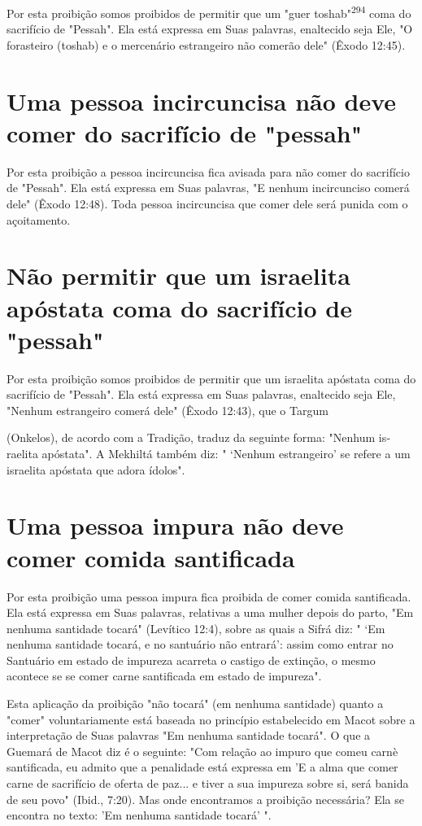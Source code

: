 \begin{itemize}
\begin{enumrate}
\begin{itemize}
\begin{itemize}
\begin{itemize}
Por esta proibição somos proibidos de permitir que um "guer
tos­hab"\textsuperscript{294} coma do sacrifício de "Pessah". Ela está
expressa em Suas palavras, enaltecido seja Ele, "O forasteiro (toshab) e
o mercenário estrangeiro não co­merão dele" (Êxodo 12:45).

\section{Uma pessoa incircuncisa não deve comer do sacrifício de "pessah"}

Por esta proibição a pessoa incircuncisa fica avisada para não comer do
sacrifício de "Pessah". Ela está expressa em Suas palavras, "E nenhum
incir­cunciso comerá dele" (Êxodo 12:48). Toda pessoa incircuncisa que
comer de­le será punida com o açoitamento.

\section{Não permitir que um israelita apóstata coma do sacrifício de "pessah"}

Por esta proibição somos proibidos de permitir que um israelita
após­tata coma do sacrifício de "Pessah". Ela está expressa em Suas
palavras, enalte­cido seja Ele, "Nenhum estrangeiro comerá dele" (Êxodo
12:43), que o Targum

(Onkelos), de acordo com a Tradição, traduz da seguinte forma: "Nenhum
is­raelita apóstata". A Mekhiltá também diz: " `Nenhum estrangeiro' se
refere a um israelita apóstata que adora ídolos".

\section{Uma pessoa impura não deve comer comida santificada}

Por esta proibição uma pessoa impura fica proibida de comer co­mida
santificada. Ela está expressa em Suas palavras, relativas a uma mulher
depois do parto, "Em nenhuma santidade tocará" (Levítico 12:4), sobre as
quais a Sifrá diz: " `Em nenhuma santidade tocará, e no santuário não
entrará': assim como entrar no Santuário em estado de impureza acarreta
o castigo de extinção, o mesmo acontece se se comer carne santificada em
estado de impureza".

Esta aplicação da proibição "não tocará" (em nenhuma santidade) quanto a
"comer" voluntariamente está baseada no princípio estabelecido em Macot
sobre a interpretação de Suas palavras "Em nenhuma santidade tocará". O
que a Guemará de Macot diz é o seguinte: "Com relação ao impuro que
co­meu carnè santificada, eu admito que a penalidade está expressa em 'E
a alma que comer carne de sacrifício de oferta de paz... e tiver a sua
impureza sobre si, será banida de seu povo" (Ibid., 7:20). Mas onde
encontramos a proibição necessária? Ela se encontra no texto: 'Em
nenhuma santidade tocará' ".


\end{itemize}
\end{itemize}
\end{itemize}
\end{enumrate}
\end{itemize}
